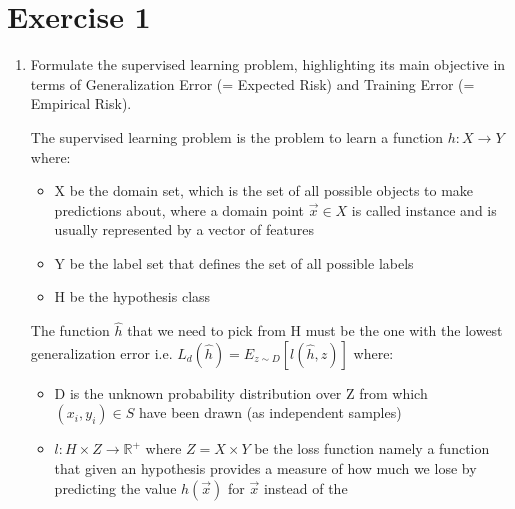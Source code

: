 \documentclass[a4paper,11pt,oneside]{book}
\begin{document}
\section{Exercise 1}
\begin{enumerate}
    \item Formulate the supervised learning problem, highlighting its main objective in terms of Generalization Error (= Expected Risk) and Training Error (= Empirical Risk).
        \begin{solution}
            The supervised learning problem is the problem to learn a function $h: X \to Y$ where:
            
            \begin{itemize}
            \item X be the domain set, which is the set of all possible objects to make predictions about, where a domain point $\vec{x} \in X$ is called instance and is usually represented by a vector of features
            
            \item Y be the label set that defines the set of all possible labels
            
            \item H be the hypothesis class
            \end{itemize}
            
            The function $\hat{h}$ that we need to pick from H must be the one with the lowest generalization error i.e. $L_d(\hat{h}) = E_{z\sim D}[l(\hat{h},z)]$ where:
            
            \begin{itemize}
            \item D is the unknown probability distribution over Z from which $(x_i,y_i) \in S$ have been drawn (as independent samples)
            
            \item $l: H\times Z \to \mathbb{R}^+$ where $Z = X\times Y$ be the loss function namely a function that given an hypothesis provides a measure of how much we lose by predicting the value $h(\vec{x})$ for $\vec{x}$ instead of the
            \end{itemize}
            

\end{solution}
\end{enumerate}
\end{document}

